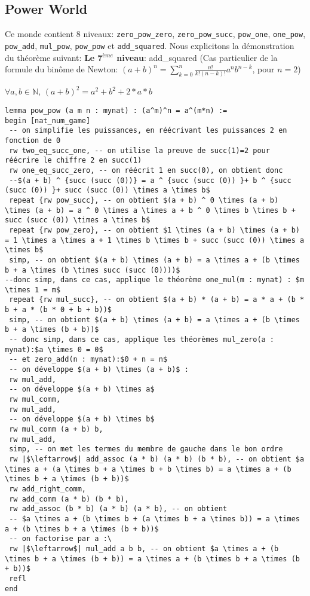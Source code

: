 \subsection{Power World}
Ce monde contient 8 niveaux: \texttt{zero\_pow\_zero}, \texttt{zero\_pow\_succ}, \texttt{pow\_one}, \texttt{one\_pow}, \texttt{pow\_add}, \texttt{mul\_pow}, \texttt{pow\_pow} et \texttt{add\_squared}.
Nous explicitons la démonstration du théorème suivant:
\textbf{Le 7$^{ème}$ niveau}: add\_squared (Cas particulier de la formule du binôme de Newton: $(a+b)^n=\sum_{k=0}^{n}{\frac{n!}{k!(n-k)!} a^nb^{n-k}}$, pour $n=2$)
\begin{center} $\forall a, b \in \mathbb{N}$, $(a+b)^2=a^2+b^2+2*a*b $\end{center}
\begin{verbatim}
lemma pow_pow (a m n : mynat) : (a^m)^n = a^(m*n) :=
begin [nat_num_game]
 -- on simplifie les puissances, en réécrivant les puissances 2 en fonction de 0 
 rw two_eq_succ_one, -- on utilise la preuve de succ(1)=2 pour réécrire le chiffre 2 en succ(1)
 rw one_eq_succ_zero, -- on réécrit 1 en succ(0), on obtient donc 
 --$(a + b) ^ {succ (succ (0))} = a ^ {succ (succ (0)) }+ b ^ {succ (succ (0)) }+ succ (succ (0)) \times a \times b$
 repeat {rw pow_succ}, -- on obtient $(a + b) ^ 0 \times (a + b) \times (a + b) = a ^ 0 \times a \times a + b ^ 0 \times b \times b + succ (succ (0)) \times a \times b$ 
 repeat {rw pow_zero}, -- on obtient $1 \times (a + b) \times (a + b) = 1 \times a \times a + 1 \times b \times b + succ (succ (0)) \times a \times b$
 simp, -- on obtient $(a + b) \times (a + b) = a \times a + (b \times b + a \times (b \times succ (succ (0))))$
--donc simp, dans ce cas, applique le théorème one_mul(m : mynat) : $m \times 1 = m$
 repeat {rw mul_succ}, -- on obtient $(a + b) * (a + b) = a * a + (b * b + a * (b * 0 + b + b))$
 simp, -- on obtient $(a + b) \times (a + b) = a \times a + (b \times b + a \times (b + b))$
 -- donc simp, dans ce cas, applique les théorèmes mul_zero(a : mynat):$a \times 0 = 0$ 
 -- et zero_add(n : mynat):$0 + n = n$
 -- on développe $(a + b) \times (a + b)$ :
 rw mul_add,
 -- on développe $(a + b) \times a$ 
 rw mul_comm,
 rw mul_add,
 -- on développe $(a + b) \times b$ 
 rw mul_comm (a + b) b,
 rw mul_add,
 simp, -- on met les termes du membre de gauche dans le bon ordre 
 rw |$\leftarrow$| add_assoc (a * b) (a * b) (b * b), -- on obtient $a \times a + (a \times b + a \times b + b \times b) = a \times a + (b \times b + a \times (b + b))$
 rw add_right_comm,
 rw add_comm (a * b) (b * b),
 rw add_assoc (b * b) (a * b) (a * b), -- on obtient 
 -- $a \times a + (b \times b + (a \times b + a \times b)) = a \times a + (b \times b + a \times (b + b))$
 -- on factorise par a :\
 rw |$\leftarrow$| mul_add a b b, -- on obtient $a \times a + (b \times b + a \times (b + b)) = a \times a + (b \times b + a \times (b + b))$
 refl
end
\end{verbatim}
